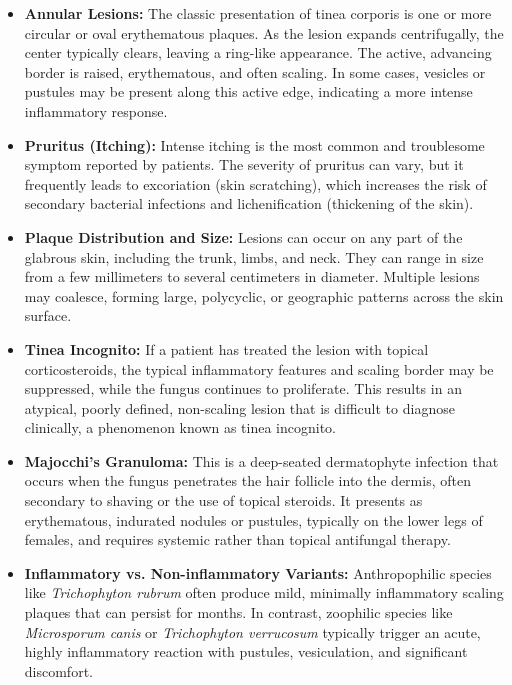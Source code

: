 \begin{itemize}
    \item \textbf{Annular Lesions:} The classic presentation of tinea corporis is one or more circular or oval erythematous plaques. As the lesion expands centrifugally, the center typically clears, leaving a ring-like appearance. The active, advancing border is raised, erythematous, and often scaling. In some cases, vesicles or pustules may be present along this active edge, indicating a more intense inflammatory response.
    \item \textbf{Pruritus (Itching):} Intense itching is the most common and troublesome symptom reported by patients. The severity of pruritus can vary, but it frequently leads to excoriation (skin scratching), which increases the risk of secondary bacterial infections and lichenification (thickening of the skin).
    \item \textbf{Plaque Distribution and Size:} Lesions can occur on any part of the glabrous skin, including the trunk, limbs, and neck. They can range in size from a few millimeters to several centimeters in diameter. Multiple lesions may coalesce, forming large, polycyclic, or geographic patterns across the skin surface.
    \item \textbf{Tinea Incognito:} If a patient has treated the lesion with topical corticosteroids, the typical inflammatory features and scaling border may be suppressed, while the fungus continues to proliferate. This results in an atypical, poorly defined, non-scaling lesion that is difficult to diagnose clinically, a phenomenon known as tinea incognito.
    \item \textbf{Majocchi's Granuloma:} This is a deep-seated dermatophyte infection that occurs when the fungus penetrates the hair follicle into the dermis, often secondary to shaving or the use of topical steroids. It presents as erythematous, indurated nodules or pustules, typically on the lower legs of females, and requires systemic rather than topical antifungal therapy.
    \item \textbf{Inflammatory vs. Non-inflammatory Variants:} Anthropophilic species like \textit{Trichophyton rubrum} often produce mild, minimally inflammatory scaling plaques that can persist for months. In contrast, zoophilic species like \textit{Microsporum canis} or \textit{Trichophyton verrucosum} typically trigger an acute, highly inflammatory reaction with pustules, vesiculation, and significant discomfort.
\end{itemize}

